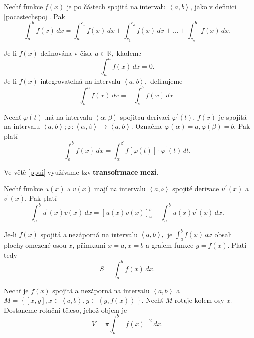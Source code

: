 \begin{veta}
Nechť funkce $f(x)$ je po částech spojitá na intervalu $\left < a,b \right > $, jako
v definici \ref{pocastechspoj}. Pak
$$\int_a^b f(x)\, dx = \int_a^{c_1}f(x)\, dx + \int_{c_1}^{c_2}f(x)\, dx + \dots + \int_{c_n}^b f(x)\, dx.$$
\end{veta}

\begin{definition}
Je-li $f(x)$ definována v čísle $a \in \mathbb R,$ klademe
$$\int _a ^a f(x)\, dx = 0.$$
Je-li $f(x)$ integrovatelná na intervalu $\left < a,b \right > ,$ definujeme
$$\int_b^a f(x)\, dx = -\int_a^b f(x)\, dx.$$
\end{definition}


\begin{veta}\label{ppui}
Nechť $\varphi (t)$ má na intervalu $\left < \alpha, \beta  \right > $ spojitou derivaci
$\varphi^\prime (t)$, $f(x)$ je spojitá na intervalu $\left < a,b \right >;
\varphi: \left < \alpha, \beta \right >\to \left < a,b \right >  $. Označme
$\varphi(\alpha)=a, \varphi(\beta)=b.$ Pak platí
$$\int _a ^b f(x)\, dx = \int _\alpha ^\beta f \left [ \varphi(t) \right ]\cdot \varphi^\prime (t)\, dt. $$
\end{veta}

\begin{pozn}
    Ve větě \ref{ppui} využíváme tzv \textbf{transofrmace mezí}.
\end{pozn}

\begin{veta}
Nechť funkce $u(x)$ a $v(x)$ mají na intervalu $\left < a,b \right > $ spojité derivace
$u^\prime (x)$ a $v^\prime (x)$. Pak platí
$$\int_a ^b u^\prime (x)v(x)\, dx = \left [ u(x)v(x) \right ]_a^b -\int _a^b u(x)v^\prime(x)\,dx.$$
\end{veta}

\begin{pozn}
    Je-li $f(x)$ spojitá a nezáporná na intervalu $\left < a,b \right > ,$ je
    $\int_a ^b f(x)\, dx$ obsah plochy omezené osou $x$, přímkami $x=a, x=b$ a
    grafem funkce $y=f(x)$. Platí tedy
    $$S=\int_a^b f(x)\, dx.$$
\end{pozn}

\begin{pozn}
    Nechť je $f(x)$ spojitá a nezáporná na intervalu $\left < a,b \right > $ a
    $M=\left \{ \left [ x,y \right ], x \in \left < a,b \right >, y \in \left < y, f(x) \right >    \right \} .$
    Nechť $M$ rotuje kolem osy $x$. Dostaneme rotační těleso, jehož objem je
    $$V=\pi \int _a^b \left [ f(x) \right ]^2 \, dx. $$
\end{pozn}
